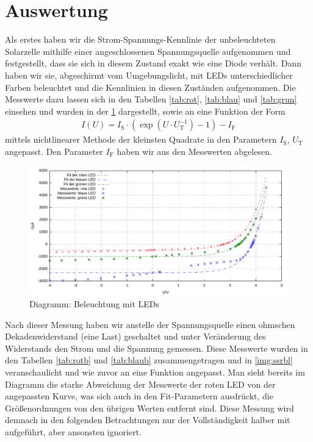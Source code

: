 \documentclass[numbers=noenddot,12pt,a4paper]{scrartcl}
\newcommand{\ix}[1]{_\text{#1}}
\begin{document}
\section{Auswertung}
Als erstes haben wir die Strom-Spannungs-Kennlinie der unbeleuchteten Solarzelle mithilfe einer angeschlossenen Spannungsquelle aufgenommen und festgestellt, dass sie sich in diesem Zustand exakt wie eine Diode verhält. Dann haben wir sie, abgeschirmt vom Umgebungslicht, mit LEDs unterschiedlicher Farben beleuchtet und die Kennlinien in diesen Zuständen aufgenommen. Die Messwerte dazu lassen sich in den Tabellen \ref{tab:rot}, \ref{tab:blau} und \ref{tab:grun} einsehen und wurden in der \ref{img:ssrl} dargestellt, sowie an eine Funktion der Form
\begin{align}
I(U)=I\ix{S}\cdot\left(\exp\left(U\cdot U\ix{T}^{-1}\right)-1\right)-I\ix{F}\label{eq:IUenhanced}
\end{align}
mittels nichtlinearer Methode der kleinsten Quadrate in den Parametern $I\ix{S}$, $U\ix{T}$ angepasst. Den Parameter $I\ix{F}$ haben wir aus den Messwerten abgelesen.
\begin{figure}[H]
	\includegraphics[width=1\textwidth]{messwerte/stromspannungspannungsrichtigled.pdf}
	\caption{Diagramm: Beleuchtung mit LEDs} \label{img:ssrl}
\end{figure}
Nach dieser Messung haben wir anstelle der Spannungsquelle einen ohmschen Dekadenwiderstand (eine Last) geschaltet und unter Veränderung des Widerstands den Strom und die Spannung gemessen. Diese Messwerte wurden in den Tabellen \ref{tab:rotb} und \ref{tab:blaub} zusammengetragen und in \ref{img:ssrbl} veranschaulicht und wie zuvor an eine Funktion angepasst. Man sieht bereits im Diagramm die starke Abweichung der Messwerte der roten LED von der angepassten Kurve, was sich auch in den Fit-Parametern ausdrückt, die Größenordnungen von den übrigen Werten entfernt sind. Diese Messung wird demnach in den folgenden Betrachtungen nur der Vollständigkeit halber mit aufgeführt, aber ansonsten ignoriert.
\end{document}
